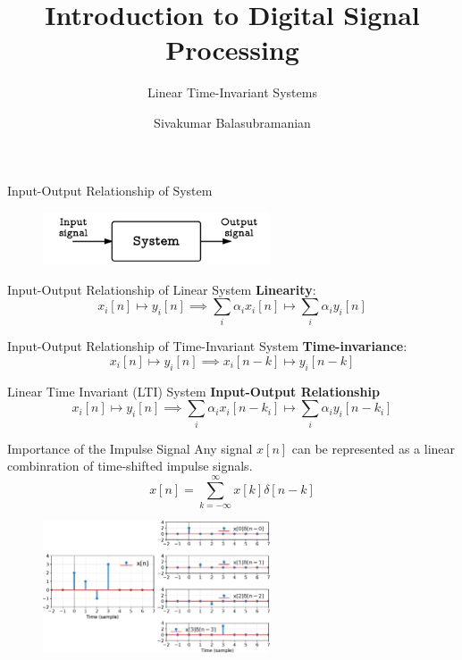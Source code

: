 \documentclass[aspectratio=169]{beamer}
\title{Introduction to Digital Signal Processing}
\subtitle{Linear Time-Invariant Systems}
\author{Sivakumar Balasubramanian}
\institute[Christian Medical College] %
{
  \inst{}%
  Department of Bioengineering\\
  Christian Medical College, Bagayam\\
  Vellore 632002
}
\date{}
\begin{document}
\begin{frame}
  \titlepage
\end{frame}

\begin{frame}[t]{Input-Output Relationship of System}
\begin{figure}
\includegraphics[width=0.6\textwidth]{img/system.png}
\end{figure}
\end{frame}

\begin{frame}[t]{Input-Output Relationship of Linear System}
\textbf{Linearity}:
\[ x_i[n] \mapsto y_i[n] \implies \sum_{i} \alpha_i x_i[n] \mapsto \sum_{i} \alpha_i y_i[n] \]
\end{frame}

\begin{frame}[t]{Input-Output Relationship of Time-Invariant System}
\textbf{Time-invariance}:  
\[ x_i[n] \mapsto y_i[n] \implies x_i[n - k] \mapsto y_i[n-k] \]
\end{frame}

\begin{frame}[t]{Linear Time Invariant (LTI) System}
\textbf{Input-Output Relationship}
\[ x_i[n] \mapsto y_i[n] \implies \sum_{i} \alpha_i x_i[n - k_i] \mapsto \sum_{i} \alpha_i y_i[n - k_i] \]
\end{frame}

\begin{frame}[t]{Importance of the Impulse Signal}
Any signal $x[n]$ can be represented as a linear combinration of time-shifted impulse signals.
\[ x[n]  = \sum_{k=-\infty}^{\infty} x[k] \delta[n - k] \]
\begin{figure}
\includegraphics[width=0.6\textwidth]{img/sigimpdecomp.eps}
\end{figure}
\end{frame}
\end{document}
